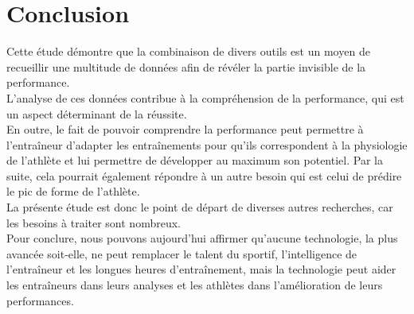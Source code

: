 \chapter*{Conclusion}

Cette étude démontre que la combinaison de divers outils est un moyen de recueillir une multitude de données afin de révéler la partie invisible de la performance. \\

L'analyse de ces données contribue à la compréhension de la performance, qui est un aspect déterminant de la réussite.\\

En outre, le fait de pouvoir comprendre la performance peut permettre à l'entraîneur d'adapter les entraînements pour qu'ils correspondent à la physiologie de l'athlète et lui permettre de développer au maximum son potentiel. Par la suite, cela pourrait également répondre à un autre besoin qui est celui de prédire le pic de forme de l'athlète. \\

La présente étude est donc le point de départ de diverses autres recherches, car les besoins à traiter sont nombreux.\\

Pour conclure, nous pouvons aujourd'hui affirmer qu'aucune technologie, la plus avancée soit-elle, ne peut remplacer le talent du sportif, l'intelligence de l’entraîneur et les longues heures d’entraînement, mais la technologie peut aider les entraîneurs dans leurs analyses et les athlètes dans l'amélioration de leurs performances.\\






